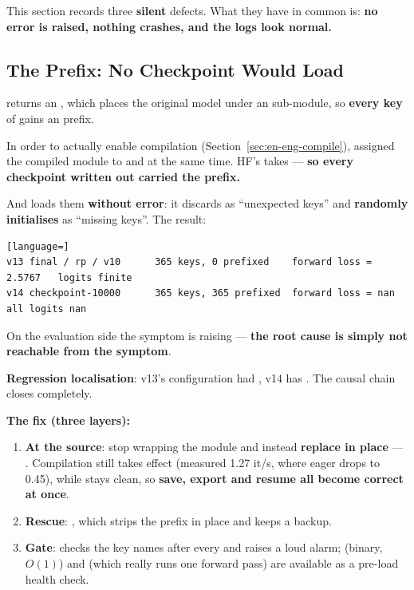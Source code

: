 This section records three \textbf{silent} defects. What they have in common is:
\textbf{no error is raised, nothing crashes, and the logs look normal.}

\subsection{The  Prefix: No Checkpoint Would Load}
\label{sec:en-def-prefix}

 returns an , which places the original model
under an  sub-module, so \textbf{every key} of  gains an
 prefix.

In order to actually enable compilation (Section~\ref{sec:en-eng-compile}),
 assigned the compiled module to  and
 at the same time. HF's  takes
 --- \textbf{so every checkpoint written out carried the
prefix.}

And  loads them \textbf{without error}: it discards
 as ``unexpected keys'' and \textbf{randomly initialises} 
as ``missing keys''. The result:

\begin{lstlisting}[language=]
v13 final / rp / v10      365 keys, 0 prefixed    forward loss = 2.5767   logits finite
v14 checkpoint-10000      365 keys, 365 prefixed  forward loss = nan      all logits nan
\end{lstlisting}

On the evaluation side the symptom is  raising
 --- \textbf{the root cause is simply not
reachable from the symptom}.

\textbf{Regression localisation}: v13's configuration had , v14 has
. The causal chain closes completely.

\textbf{The fix (three layers):}

\begin{enumerate}
\item \textbf{At the source}: stop wrapping the module and instead \textbf{replace
       in place} ---
      . Compilation still
      takes effect (measured 1.27 it/s, where eager drops to 0.45), while 
      stays clean, so \textbf{save, export and resume all become correct at once}.
\item \textbf{Rescue}: , which strips the prefix in
      place and keeps a  backup.
\item \textbf{Gate}:  checks the key names after every
       and raises a loud alarm;
       (binary, $O(1)$) and
       (which really runs one forward pass) are
      available as a pre-load health check.
\end{enumerate}

